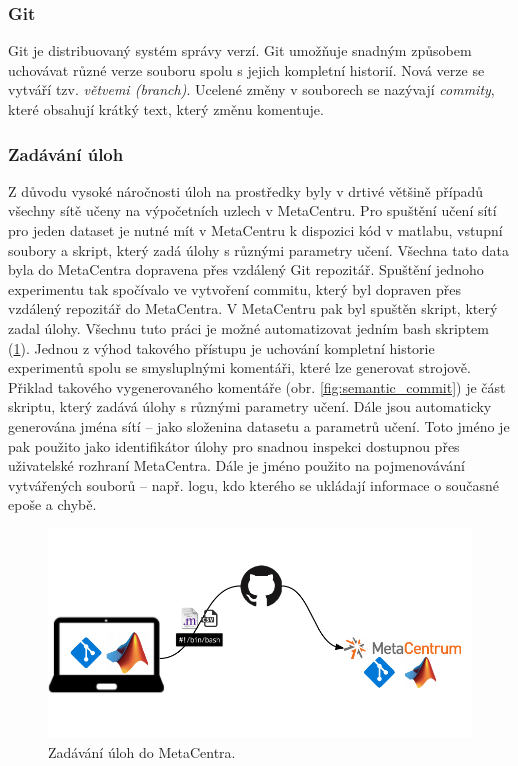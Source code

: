 \documentclass[thesis=M,czech]{FITthesis}[2012/06/26]
\begin{document}
\subsubsection*{Git}
Git je distribuovaný systém správy verzí. Git umožňuje snadným způsobem uchovávat různé verze souboru spolu s jejich kompletní historií. Nová verze se vytváří tzv. \textit{větvemi (branch)}. Ucelené změny v souborech se nazývají \textit{commity}, které  obsahují krátký text, který změnu komentuje.


\subsubsection*{Zadávání úloh}
Z důvodu vysoké náročnosti úloh na prostředky byly v drtivé většině případů všechny sítě učeny na výpočetních uzlech v MetaCentru. Pro spuštění učení sítí pro jeden dataset je nutné mít v MetaCentru k dispozici kód v matlabu, vstupní soubory a skript, který zadá úlohy s různými parametry učení. Všechna tato data byla do MetaCentra dopravena přes vzdálený Git repozitář. Spuštění jednoho experimentu tak spočívalo ve vytvoření commitu, který byl dopraven přes vzdálený repozitář do MetaCentra. V MetaCentru pak byl spuštěn skript, který zadal úlohy. Všechnu tuto práci je možné automatizovat jedním bash skriptem (\ref{fig:up}). 
Jednou z výhod takového přístupu je uchování kompletní historie experimentů spolu se smysluplnými komentáři, které lze generovat strojově. Přiklad takového vygenerovaného komentáře (obr. \ref{fig:semantic_commit}) je část skriptu, který zadává úlohy s různými parametry učení. Dále jsou automaticky generována jména sítí -- jako složenina datasetu a parametrů učení. Toto jméno je pak použito jako identifikátor úlohy pro snadnou inspekci dostupnou přes uživatelské rozhraní MetaCentra. Dále je jméno použito na pojmenovávání vytvářených souborů -- např. logu, kdo kterého se ukládají informace o současné epoše a chybě.

\begin{figure}[htbp]
\begin{center}
	\includegraphics[scale=0.9]{up.png}
\caption{Zadávání úloh do MetaCentra.}
\label{fig:up}
\end{center}
\end{figure}
\end{document}
